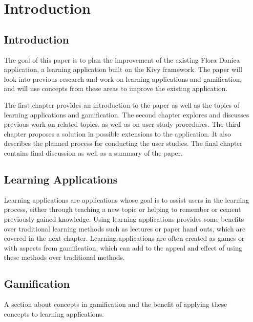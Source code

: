 
\chapter{Introduction}

\label{Chapter1}



\section{Introduction}

The goal of this paper is to plan the improvement of the existing Flora Danica application, a learning application built on the Kivy framework. The paper will look into previous research and work on learning applications and gamification, and will use concepts from these areas to improve the existing application.

The first chapter provides an introduction to the paper as well as the topics of learning applications and gamification. The second chapter explores and discusses previous work on related topics, as well as on user study procedures. The third chapter proposes a solution in possible extensions to the application. It also describes the planned process for conducting the user studies. The final chapter contains final discussion as well as a summary of the paper.


\section{Learning Applications}

Learning applications are applications whose goal is to assist users in the learning process, either through teaching a new topic or helping to remember or cement previously gained knowledge. Using learning applications provides some benefits over traditional learning methods such as lectures or paper hand outs, which are covered in the next chapter. Learning applications are often created as games or with aspects from gamification, which can add to the appeal and effect of using these methods over traditional methods.


\section{Gamification}

A section about concepts in gamification and the benefit of applying these concepts to learning applications.